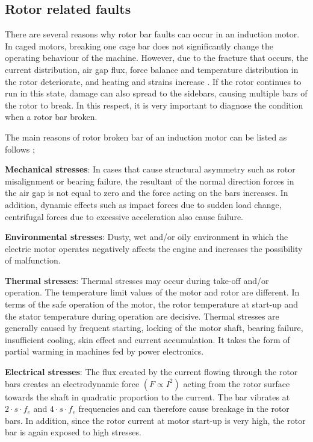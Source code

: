 \subsection{Rotor related faults}

There are several reasons why rotor bar faults can occur in an induction motor. In caged motors, breaking one cage bar does not significantly change the operating behaviour of the machine. However, due to the fracture that occurs, the current distribution, air gap flux, force balance and temperature distribution in the rotor deteriorate, and heating and strains increase \cite{imeryuz2009asenkron}. If the rotor continues to run in this state, damage can also spread to the sidebars, causing multiple bars of the rotor to break. In this respect, it is very important to diagnose the condition when a rotor bar broken.

The main reasons of rotor broken bar of an induction motor can be listed as follows \cite{imeryuz2009asenkron,filippetti2013condition,bonnett1999root,Siddique};

\textbf{Mechanical stresses}: In cases that cause structural asymmetry such as rotor misalignment or bearing failure, the resultant of the normal direction forces in the air gap is not equal to zero and the force acting on the bars increases. In addition, dynamic effects such as impact forces due to sudden load change, centrifugal forces due to excessive acceleration also cause failure.

\textbf{Environmental stresses}: Dusty, wet and/or oily environment in which the electric motor operates negatively affects the engine and increases the possibility of malfunction.

\textbf{Thermal stresses}: Thermal stresses may occur during take-off and/or operation. The temperature limit values of the motor and rotor are different. In terms of the safe operation of the motor, the rotor temperature at start-up and the stator temperature during operation are decisive. Thermal stresses are generally caused by frequent starting, locking of the motor shaft, bearing failure, insufficient cooling, skin effect and current accumulation. It takes the form of partial warming in machines fed by power electronics.

\textbf{Electrical stresses}: The flux created by the current flowing through the rotor bars creates an electrodynamic force $(F \propto I^2)$ acting from the rotor surface towards the shaft in quadratic proportion to the current. The bar vibrates at $2\cdot s\cdot f_{e}$ and $4\cdot s\cdot f_{e}$  frequencies and can therefore cause breakage in the rotor bars. In addition, since the rotor current at motor start-up is very high, the rotor bar is again exposed to high stresses.

